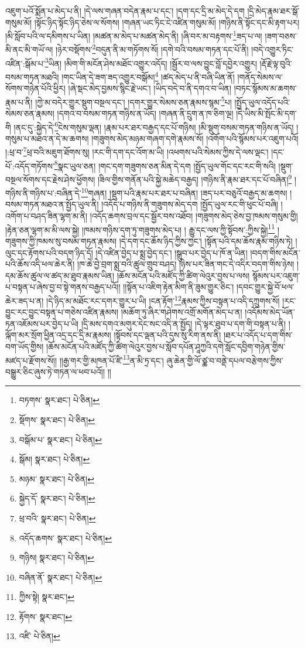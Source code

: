 འཇུག་པའོ་སྨོན་པ་མེད་པ་ནི། །དེ་ལས་གཞན་བདེན་རྣམ་པ་དང་། །དག་དང་དྲི་མ་མེད་དེ་དག །དྲི་མེད་རྣམ་ཐར་སྒོ་གསུམ་མོ། །སྟོང་ཉིད་སྟོང་ཉིད་ཅེས་ལ་སོགས། །གཞན་ཡང་ཏིང་ངེ་འཛིན་གསུམ་མོ། །གཉིས་ནི་སྟོང་དང་མི་རྟག་པར། །མི་སློབ་པའི་ལ་དམིགས་པ་ཡིན། །མཚན་མ་མེད་པ་མཚན་མེད་ནི། །ཞི་བར་མ་བརྟགས་\footnote{བཏགས་  སྣར་ཐང་།  པེ་ཅིན། }ཟད་པ་ལ། །ཟག་བཅས་མི་ནང་མི་གཡོ་ལ། །ཉེར་བསྡོགས་\footnote{སྡོགས་  སྣར་ཐང་།  པེ་ཅིན། }བདུན་ནི་མ་གཏོགས་སོ། །དགེ་བའི་བསམ་གཏན་དང་པོ་ནི། །བདེ་འགྱུར་ཏིང་འཛིན་:སྒོམ་པ་\footnote{བསྒོམ་པ་  སྣར་ཐང་།  པེ་ཅིན། }ཡིན། །མིག་གི་མངོན་ཤེས་མཐོང་འགྱུར་འདོད། །སྦྱོར་བ་ལས་བྱུང་བློ་དབྱེར་འགྱུར། །རྡོ་རྗེ་ལྟ་བུའི་བསམ་གཏན་མཐའི། །གང་ཡིན་དེ་ཟག་ཟད་འགྱུར་བསྒོམ།\footnote{སྒོམ།  སྣར་ཐང་།  པེ་ཅིན། } །ཚད་མེད་པ་ནི་བཞི་ཡིན་ནོ། །གནོད་སེམས་ལ་སོགས་གཉེན་པོའི་ཕྱིར། །ཞེ་སྡང་མེད་བྱམས་སྙིང་རྗེ་ཡང་། །ཡིད་བདེ་བ་ནི་དགའ་བ་ཡིན། །བཏང་སྙོམས་མ་ཆགས་རྣམ་པ་ནི། །ཀྱེ་མ་བདེར་གྱུར་སྡུག་བསྔལ་དང་། །དགར་གྱུར་སེམས་ཅན་རྣམས་སྙམ་\footnote{མཉམ་  སྣར་ཐང་།  པེ་ཅིན། }པ། །སྤྱོད་ཡུལ་འདོད་པའི་སེམས་ཅན་རྣམས། །དགའ་བ་བསམ་གཏན་གཉིས་ན་ཡོད། །གཞན་ནི་དྲུག་ན་ཁ་ཅིག་ལྔ། །དེ་ཡིས་མི་སྤོང་མི་དག་གི །ནང་དུ་:སྐྱེད་དེ་\footnote{སྐྱེད་དོ་  སྣར་ཐང་།  པེ་ཅིན། }ངེས་གསུམ་ལྡན། །རྣམ་པར་ཐར་བརྒྱད་དང་པོ་གཉིས། །མི་སྡུག་བསམ་གཏན་གཉིས་ན་ཡོད། །གསུམ་པ་མཐའ་ན་དེ་མ་ཆགས། །གཟུགས་མེད་མཉམ་གཞག་དགེ་རྣམས་སོ། །འགོག་པའི་སྙོམས་པར་འཇུག་པའོ། །:ཕྲ་བ་\footnote{ཕྲ་བའི་  སྣར་ཐང་།  པེ་ཅིན། }ཕྲ་བའི་མཇུག་ཐོགས་སུ། །རང་གི་དག་དང་འོག་མ་ཡི། །འཕགས་པའི་སེམས་ཀྱིས་དེ་ལས་ལྡང་། །དང་པོ་:འདོད་གཏོགས་\footnote{འདོད་ཆགས་  སྣར་ཐང་།  པེ་ཅིན། }སྣང་ཡུལ་ཅན། །གང་དག་གཟུགས་ཅན་མིན་དེ་དག །སྤྱོད་ཡུལ་གོང་དང་རང་གི་སའི། །སྡུག་བསྔལ་སོགས་དང་རྗེས་ཤེས་ཕྱོགས། །ཟིལ་གྱིས་གནོན་པའི་སྐྱེ་མཆེད་བརྒྱད། །གཉིས་ནི་རྣམ་ཐར་དང་པོ་བཞིན།\footnote{གཉིས།  སྣར་ཐང་།  པེ་ཅིན། } །གཉིས་ནི་གཉིས་པ་:བཞིན་དེ་\footnote{བཞིན་ནོ་  སྣར་ཐང་།  པེ་ཅིན། }གཞན། །སྡུག་པའི་རྣམ་པར་ཐར་པ་བཞིན། །ཟད་པར་བཅུའོ་བརྒྱད་མ་ཆགས། །བསམ་གཏན་མཐའ་ན་སྤྱོད་ཡུལ་ནི། །འདོད་པ་གཉིས་ནི་གཟུགས་མེད་དག །སྤྱོད་ཡུལ་རང་གི་ཕུང་པོ་བཞི། །འགོག་པ་བཤད་ཟིན་ལྷག་མ་ནི། །འདོད་ཆགས་བྲལ་དང་སྦྱོར་བས་འཐོབ། །གཟུགས་མེད་ཅེས་བྱ་ཁམས་གསུམ་གྱི། །རྟེན་ཅན་ལྷག་མ་མི་ལས་སྐྱེ། །ཁམས་གཉིས་དག་ཏུ་གཟུགས་མེད་པ། །
རྒྱུ་དང་ལས་ཀྱི་སྟོབས་:ཀྱིས་སྐྱེ།\footnote{ཀྱིས་སྟེ།  སྣར་ཐང་། } །གཟུགས་ཀྱི་ཁམས་སུ་བསམ་གཏན་རྣམས། །དེ་དག་དང་ཆོས་ཉིད་ཀྱིས་ཀྱང་། །སྟོན་པའི་དམ་ཆོས་རྣམ་གཉིས་ཏེ། །ལུང་དང་རྟོགས་པའི་བདག་ཉིད་དོ། །དེ་འཛིན་བྱེད་པ་སྨྲ་བྱེད་དང་། །སྒྲུབ་པར་བྱེད་པ་ཁོ་ན་ཡིན། །བདག་གིས་མངོན་པའི་ཆོས་འདི་ཕལ་ཆེར་ནི། །ཁ་ཆེ་བྱེ་བྲག་སྨྲ་བའི་ཚུལ་གྲུབ་བཤད། །ཉེས་པར་ཟིན་གང་དེ་འདིར་བདག་གིས་ཉེས། །དམ་ཆོས་ཚུལ་ལ་ཚད་མ་ཐུབ་རྣམས་ཡིན། །ཆོས་མངོན་པའི་མཛོད་ཀྱི་ཚིག་ལེའུར་བྱས་པ་ལས། སྙོམས་པར་འཇུག་པ་བསྟན་པ་ཞེས་བྱ་བ་སྟེ་གནས་བརྒྱད་པའོ།། །།སྟོན་པ་འཇིག་རྟེན་མིག་ནི་ཟུམ་གྱུར་ཅིང་། །དབང་གྱུར་སྐྱེ་བོ་ཕལ་ཆེར་ཟད་པ་ན། །དེ་ཉིད་མ་མཐོང་རང་དགར་གྱུར་པ་ཡི། །ངན་རྟོག་\footnote{རྟོགས་  སྣར་ཐང་། }རྣམས་ཀྱིས་བསྟན་པ་འདི་དཀྲུགས་སོ། །རང་བྱུང་རང་བྱུང་བསྟན་པ་གཅེས་འཛིན་རྣམས། །མཆོག་ཏུ་ཞིར་གཤེགས་འགྲོ་མགོན་མེད་པ་ན། །འདོམས་མེད་ཡོན་ཏན་འཇོམས་པར་བྱེད་པ་ཡི། །དྲི་མས་དགའ་མགུར་དེང་སང་འདི་ན་སྤྱོད། །དེ་ལྟར་ཐུབ་པ་དག་གི་བསྟན་པ་ནི། །ལྐོག་མར་སྲོག་ཕྱིན་འདྲ་དང་དྲི་མ་རྣམས། །སྟོབས་དང་ལྡན་པའི་དུས་སུ་རིག་ནས་ནི། །ཐར་པ་འདོད་པ་དག་གིས་བག་ཡོད་གྱིས། །ཆོས་མངོན་པའི་མཛོད་ཀྱི་ཚིག་ལེའུར་བྱས་པ་སློབ་དཔོན་ཤཱཀྱའི་དགེ་སློང་དབྱིག་གཉེན་གྱིས་མཛད་པ་རྫོགས་སོ།། །།རྒྱ་གར་གྱི་མཁན་པོ་ཛི་\footnote{འཛི་  པེ་ཅིན། }ན་མི་ཏྲ་དང་། ཞུ་ཆེན་གྱི་ལོ་ཙྪ་བ་བནྡེ་དཔལ་བརྩེགས་ཀྱིས་བསྒྱུར་ཅིང་ཞུས་ཏེ་གཏན་ལ་ཕབ་པའོ།། །།